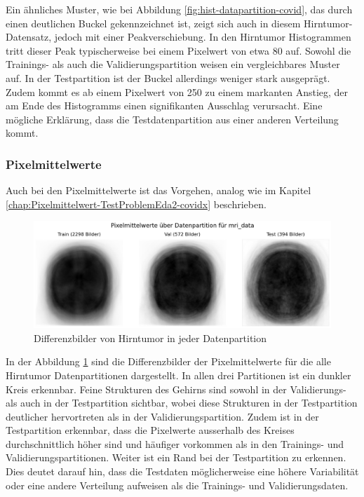 Ein ähnliches Muster, wie bei Abbildung \ref{fig:hist-datapartition-covid}, das durch einen deutlichen Buckel gekennzeichnet ist, zeigt sich auch in diesem Hirntumor-Datensatz, jedoch mit einer Peakverschiebung. In den Hirntumor Histogrammen tritt dieser Peak typischerweise bei einem Pixelwert von etwa 80 auf. Sowohl die Trainings- als auch die Validierungspartition weisen ein vergleichbares Muster auf. In der Testpartition ist der Buckel allerdings weniger stark ausgeprägt. Zudem kommt es ab einem Pixelwert von 250 zu einem markanten Anstieg, der am Ende des Histogramms einen signifikanten Ausschlag verursacht. Eine mögliche Erklärung, dass die Testdatenpartition aus einer anderen Verteilung kommt. 


\newpage

\subsubsection{Pixelmittelwerte} \label{chap:Differenzenbilder-TestProblemEda2-mri}

Auch bei den Pixelmittelwerte ist das Vorgehen, analog wie im Kapitel \ref{chap:Pixelmittelwert-TestProblemEda2-covidx} beschrieben. 

\begin{figure}[ht]
    \centering
    \includegraphics[width=\linewidth]{01-images/03-data/brain-pixelmittelwerte.png}
    \caption{Differenzbilder von Hirntumor in jeder Datenpartition}
    \label{fig:pixelmittelwerte-datapartition-brain}
\end{figure}

In der Abbildung \ref{fig:pixelmittelwerte-datapartition-brain} sind die Differenzbilder der Pixelmittelwerte für die alle Hirntumor Datenpartitionen dargestellt. In allen drei Partitionen ist ein dunkler Kreis erkennbar. Feine Strukturen des Gehirns sind sowohl in der Validierungs- als auch in der Testpartition sichtbar, wobei diese Strukturen in der Testpartition deutlicher hervortreten als in der Validierungspartition. Zudem ist in der Testpartition erkennbar, dass die Pixelwerte ausserhalb des Kreises durchschnittlich höher sind und häufiger vorkommen als in den Trainings- und Validierungspartitionen. Weiter ist ein Rand bei der Testpartition zu erkennen. Dies deutet darauf hin, dass die Testdaten möglicherweise eine höhere Variabilität oder eine andere Verteilung aufweisen als die Trainings- und Validierungsdaten.

